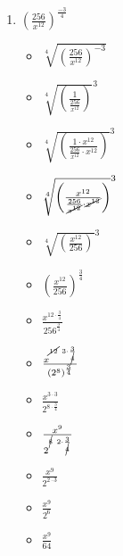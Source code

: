\documentclass{article}
\begin{document}
\begin{onehalfspace}
\begin{enumerate}[start=29]
        \item $\left( \frac{256}{x^{12}} \right)^{\frac{-3}{4}}$
        \begin{itemize}
            \item $\sqrt[4]{\left( \frac{256}{x^{12}} \right)^{-3}}$
            \item $\sqrt[4]{\left( \frac{1}{\frac{256}{x^{12}}} \right)}^{3}$
            \item $\sqrt[4]{\left( \frac{1 \cdot x^{12}}{\frac{256}{x^{12}} \cdot x^{12}} \right)}^{3}$
            \item $\sqrt[4]{\left( \frac{x^{12}}{\frac{256}{\cancel{x^{12}}} \cdot \cancel{x^{12}}} \right)}^{3}$
            \item $\sqrt[4]{\left( \frac{x^{12}}{256} \right)}^{3}$
            \item $\left( \frac{x^{12}}{256} \right)^{\frac{3}{4}}$
            \item $\frac{x^{12 \cdot \frac{3}{4}}}{256^{\frac{3}{4}}}$
            \item $\frac{x^{\cancel{12} \ 3 \cdot \frac{3}{\cancel{4}}}}{(2^{8})^{\frac{3}{4}}}$
            \item $\frac{x^{3 \cdot 3}}{2^{8 \cdot \frac{3}{4}}}$
            \item $\frac{x^{9}}{2^{\cancel{8} \ 2 \cdot \frac{3}{\cancel{4}}}}$
            \item $\frac{x^{9}}{2^{2 \cdot 3}}$
            \item $\frac{x^{9}}{2^{6}}$
            \item $\frac{x^{9}}{64}$
        \end{itemize}
    \end{enumerate}
\end{onehalfspace}
\end{document}
